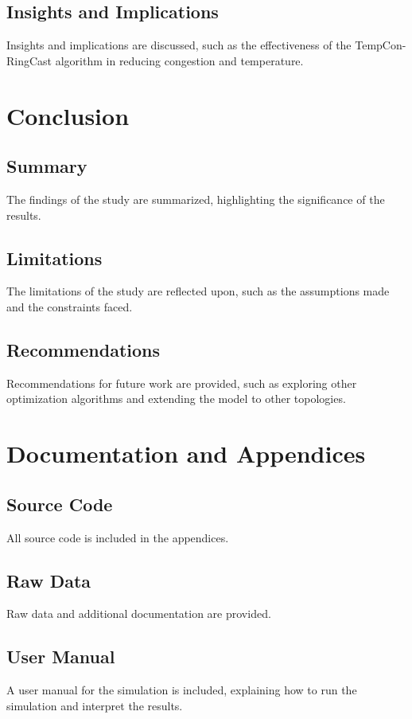 \documentclass[12pt]{article}
\begin{document}
\subsection{Insights and Implications}
Insights and implications are discussed, such as the effectiveness of the TempCon-RingCast algorithm in reducing congestion and temperature.

\section{Conclusion}
\subsection{Summary}
The findings of the study are summarized, highlighting the significance of the results.

\subsection{Limitations}
The limitations of the study are reflected upon, such as the assumptions made and the constraints faced.

\subsection{Recommendations}
Recommendations for future work are provided, such as exploring other optimization algorithms and extending the model to other topologies.

\section{Documentation and Appendices}
\subsection{Source Code}
All source code is included in the appendices.

\subsection{Raw Data}
Raw data and additional documentation are provided.

\subsection{User Manual}
A user manual for the simulation is included, explaining how to run the simulation and interpret the results.
\end{document}

